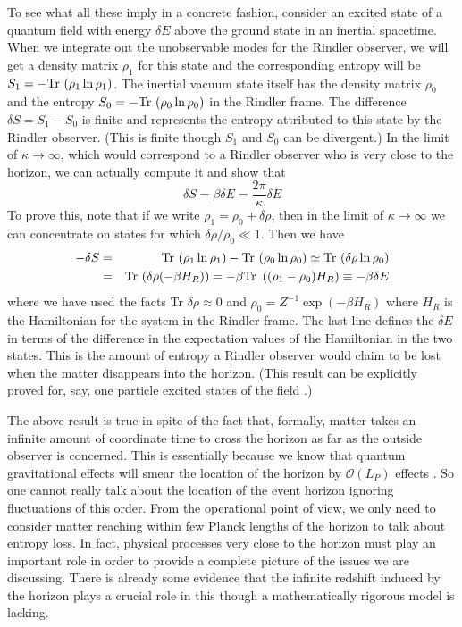 \documentclass[12pt]{iopart}
\begin{document}
To see what all these imply in a concrete fashion,  consider an excited state of a quantum field with energy  $\delta E$ above the ground state in an inertial spacetime. When we integrate out  the unobservable modes for the Rindler observer, we will get a density matrix $\rho_1$ for this state
  and the corresponding entropy will be $S_1 = - {\rm Tr}\ (\rho_1 \ln \rho_1)$.
  The inertial vacuum state itself has the density matrix $\rho_0$ and the entropy $S_0 = - {\rm Tr}\ (\rho_0 \ln \rho_0)$ in the Rindler frame. The difference $\delta S = S_1 - S_0$ is finite and 
  represents the entropy attributed to this state by the Rindler observer. (This is
  finite though $S_1$ and $S_0$ can be divergent.) In the limit of $\kappa \to \infty$,
  which would correspond to  a Rindler observer who is very close to the horizon,
   we can actually compute it and show that 
  \begin{equation}
\delta S = \beta \delta E = \frac{2\pi}{\kappa} \delta E
\label{delS}
\end{equation}
To prove this, note that if we write $\rho_1=\rho_0 + \delta \rho$, then in the limit of
$\kappa \to \infty$ we can concentrate on states for which $\delta \rho/\rho_0\ll 1$.
Then we have
\begin{eqnarray}
-\delta S &=& {\rm Tr}\ (\rho_1 \ln \rho_1) - {\rm Tr}\ (\rho_0 \ln \rho_0) 
\simeq {\rm Tr}\ (\delta \rho \ln \rho_0)\nonumber\\
&=& {\rm Tr}\ (\delta \rho (-\beta H_R)) = - \beta {\rm Tr}\ \left((\rho_1 -\rho_0)H_R\right) \equiv -\beta \delta E
\end{eqnarray} 
where we have used the facts Tr $\delta \rho \approx 0$ and
$\rho_0 =Z^{-1}\exp(-\beta H_R)$ where $H_R$ is the Hamiltonian for the system in the 
Rindler frame. The last line defines the $\delta E$ in terms of the difference in 
the expectation values of the Hamiltonian in the two states. 
This is the amount of entropy a Rindler observer would claim to be lost when the matter
disappears into the horizon.
(This result can be explicitly proved for, say, one particle excited states of the field
\cite{kkp}.) 

The above result is true in spite of the fact that, formally, matter takes  an infinite amount of
coordinate time to cross the horizon as far as the outside observer is concerned.
This is essentially because
we know that quantum gravitational effects will smear the location of the horizon by $\mathcal{O} (L_P)$ effects \cite{tplimitations}.
 So one cannot really talk about the location of the event horizon ignoring fluctuations of this order. From the operational point of view, we only need to consider matter reaching within few Planck lengths of the horizon to talk about entropy loss.
 In fact, physical processes very close to the horizon must play an important role
in order to provide a complete picture of the issues we are discussing. There is 
already some evidence \cite{Padmanabhan:1998jp,Padmanabhan:1998vr} that the infinite redshift induced by the horizon plays a crucial
role in this though a mathematically rigorous model is lacking.
\end{document}
